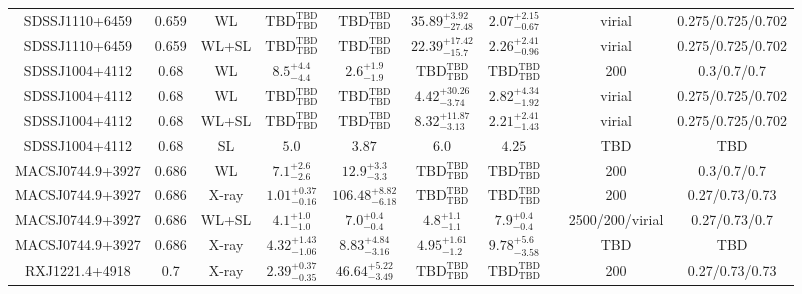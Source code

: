 \begin{table}
\begin{tabular}{cccccccccc}
SDSSJ1110+6459 & 0.659 & WL & ${\mathrm{TBD}}^{\mathrm{TBD}}_{\mathrm{TBD}}$ & ${\mathrm{TBD}}^{\mathrm{TBD}}_{\mathrm{TBD}}$ & ${35.89}^{+3.92}_{-27.48}$ & ${2.07}^{+2.15}_{-0.67}$ & \citet{OG12.1} & virial & 0.275/0.725/0.702 \\
SDSSJ1110+6459 & 0.659 & WL+SL & ${\mathrm{TBD}}^{\mathrm{TBD}}_{\mathrm{TBD}}$ & ${\mathrm{TBD}}^{\mathrm{TBD}}_{\mathrm{TBD}}$ & ${22.39}^{+17.42}_{-15.7}$ & ${2.26}^{+2.41}_{-0.96}$ & \citet{OG12.1} & virial & 0.275/0.725/0.702 \\
SDSSJ1004+4112 & 0.68 & WL & ${8.5}^{+4.4}_{-4.4}$ & ${2.6}^{+1.9}_{-1.9}$ & ${\mathrm{TBD}}^{\mathrm{TBD}}_{\mathrm{TBD}}$ & ${\mathrm{TBD}}^{\mathrm{TBD}}_{\mathrm{TBD}}$ & \citet{SE14.1} & 200 & 0.3/0.7/0.7 \\
SDSSJ1004+4112 & 0.68 & WL & ${\mathrm{TBD}}^{\mathrm{TBD}}_{\mathrm{TBD}}$ & ${\mathrm{TBD}}^{\mathrm{TBD}}_{\mathrm{TBD}}$ & ${4.42}^{+30.26}_{-3.74}$ & ${2.82}^{+4.34}_{-1.92}$ & \citet{OG12.1} & virial & 0.275/0.725/0.702 \\
SDSSJ1004+4112 & 0.68 & WL+SL & ${\mathrm{TBD}}^{\mathrm{TBD}}_{\mathrm{TBD}}$ & ${\mathrm{TBD}}^{\mathrm{TBD}}_{\mathrm{TBD}}$ & ${8.32}^{+11.87}_{-3.13}$ & ${2.21}^{+2.41}_{-1.43}$ & \citet{OG12.1} & virial & 0.275/0.725/0.702 \\
SDSSJ1004+4112 & 0.68 & SL & ${5.0}^{}_{}$ & ${3.87}^{}_{}$ & ${6.0}^{}_{}$ & ${4.25}^{}_{}$ & \citet{WI04.1} & TBD & TBD \\
MACSJ0744.9+3927 & 0.686 & WL & ${7.1}^{+2.6}_{-2.6}$ & ${12.9}^{+3.3}_{-3.3}$ & ${\mathrm{TBD}}^{\mathrm{TBD}}_{\mathrm{TBD}}$ & ${\mathrm{TBD}}^{\mathrm{TBD}}_{\mathrm{TBD}}$ & \citet{SE14.1} & 200 & 0.3/0.7/0.7 \\
MACSJ0744.9+3927 & 0.686 & X-ray & ${1.01}^{+0.37}_{-0.16}$ & ${106.48}^{+8.82}_{-6.18}$ & ${\mathrm{TBD}}^{\mathrm{TBD}}_{\mathrm{TBD}}$ & ${\mathrm{TBD}}^{\mathrm{TBD}}_{\mathrm{TBD}}$ & \citet{BA14.1} & 200 & 0.27/0.73/0.73 \\
MACSJ0744.9+3927 & 0.686 & WL+SL & ${4.1}^{+1.0}_{-1.0}$ & ${7.0}^{+0.4}_{-0.4}$ & ${4.8}^{+1.1}_{-1.1}$ & ${7.9}^{+0.4}_{-0.4}$ & \citet{ME14.1} & 2500/200/virial & 0.27/0.73/0.7 \\
MACSJ0744.9+3927 & 0.686 & X-ray & ${4.32}^{+1.43}_{-1.06}$ & ${8.83}^{+4.84}_{-3.16}$ & ${4.95}^{+1.61}_{-1.2}$ & ${9.78}^{+5.6}_{-3.58}$ & \citet{SC06.1} & TBD & TBD \\
RXJ1221.4+4918 & 0.7 & X-ray & ${2.39}^{+0.37}_{-0.35}$ & ${46.64}^{+5.22}_{-3.49}$ & ${\mathrm{TBD}}^{\mathrm{TBD}}_{\mathrm{TBD}}$ & ${\mathrm{TBD}}^{\mathrm{TBD}}_{\mathrm{TBD}}$ & \citet{BA14.1} & 200 & 0.27/0.73/0.73 \\

\end{tabular}
\end{table}
